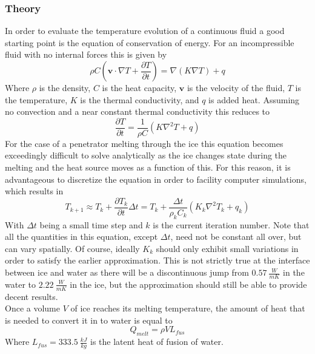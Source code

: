 \subsubsection{Theory}
In order to evaluate the temperature evolution of a continuous fluid a good starting point is the equation of conservation of energy. For an incompressible fluid with no internal forces this is given by
\begin{equation}
\rho C \left( \mathbf{v} \cdot \nabla T + \frac{\partial T}{\partial t} \right) = \nabla (K \nabla T) + q 
\end{equation} 
Where $\rho$ is the density, $C$ is the heat capacity, $\mathbf{v}$ is the velocity of the fluid, $T$ is the temperature, $K$ is the thermal conductivity, and $q$ is added heat\cite{article:barr2014a}. Assuming no convection and a near constant thermal conductivity this reduces to
\begin{equation}
\label{eq:thermal1}
\frac{\partial T}{\partial t} = \frac{1}{\rho C}\left( K \nabla^2 T + q \right)
\end{equation}
For the case of a penetrator melting through the ice this equation becomes exceedingly difficult to solve analytically as the ice changes state during the melting and the heat source moves as a function of this. For this reason, it is advantageous to discretize the equation in order to facility computer simulations, which results in\\
\begin{equation} \label{eq:thermal2}
T_{k+1} \approx T_{k} + \frac{\partial T_{k}}{\partial t}\Delta t = T_{k} + \frac{\Delta t}{\rho_k C_k}\left( K_k \nabla^2 T_{k} + q_{k} \right)
\end{equation}
With $\Delta t$ being a small time step and $k$ is the current iteration number. Note that all the quantities in this equation, except $\Delta t$, need not be constant all over, but can vary spatially. Of course, ideally $K_k$ should only exhibit small variations in order to satisfy the earlier approximation. This is not strictly true at the interface between ice and water as there will be a discontinuous jump from $\SI{0.57}{\frac{W}{m K}}$ in the water to $\SI{2.22}{\frac{W}{m K}}$\cite{website:engineeringToolbox} in the ice, but the approximation should still be able to provide decent results.\\

\noindent
Once a volume $V$ of ice reaches its melting temperature, the amount of heat that is needed to convert it in to water is equal to
\begin{equation}
Q_{melt} = \rho V L_{fus}
\end{equation}
Where $L_{fus} = \SI{333.5}{\frac{kJ}{kg}}$ is the latent heat of fusion of water\cite{article:biele2011a}.

